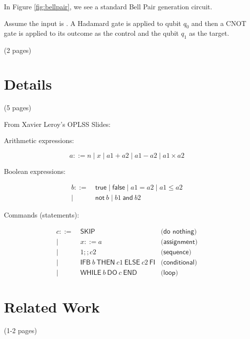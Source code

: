 \documentclass[acmsmall,review]{acmart}\settopmatter{printfolios=true,printccs=false,printacmref=false}
\begin{document}
In Figure \ref{fig:bellpair}, we see a standard Bell Pair generation circuit.

Assume the input is . A Hadamard gate is applied to qubit $q_0$ and then a CNOT gate is applied to its outcome as the control and the qubit $q_1$ as the target.

(2 pages)

\section{Details}
(5 pages)

From Xavier Leroy's OPLSS Slides:


Arithmetic expressions:

\[a ::= n \mid x \mid a1 + a2 \mid a1 - a2 \mid a1 \times a2\]

Boolean expressions:

\begin{align*}
	b ::=&\ \textsf{true} \mid \textsf{false} \mid a1 = a2 \mid a1 \le a2\\
	\mid&\ \textsf{not}\ b \mid b1\ \textsf{and}\ b2
\end{align*}

Commands (statements):

\begin{align*}
	c ::=&\ \textsf{SKIP} 														&\textsf{(do\ nothing)}\\
	\mid&\ x ::= a 															&\textsf{(assignment)}\\
	\mid&\ 1; ; c2 															&\textsf{(sequence)}\\
	\mid&\ \textsf{IFB}\ b\ \textsf{THEN}\ c1\ \textsf{ELSE}\ c2\ \textsf{FI} 	&\textsf{(conditional)}\\
	\mid&\ \textsf{WHILE}\ b\ \textsf{DO}\ c\ \textsf{END} 					&\textsf{(loop)}
\end{align*}

\section{Related Work}
(1-2 pages)

\cite{DBLP:conf/oopsla/HuangM18}

\cite{Huang:2019:SAV:3307650.3322213}

\cite{nanevski_morrisett_birkedal_2008}

\cite{paykin18}

\cite{rand18}

\cite{2015arXiv151002198R}
\end{document}

